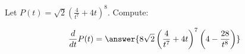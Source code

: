 \documentclass{ximera}
\begin{document}
\begin{exercise}
Let $P(t) = \sqrt{2} \left(\frac{4}{t^7} + 4t \right)^{8}$. Compute:

\[
\dd{t}P(t) = \answer{ 8\sqrt{2} \left(  \frac{4}{t^7} + 4t \right)^{7} \left(4-\frac{28}{t^8}\right)}
\]
\end{exercise}
\end{document}

